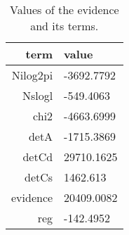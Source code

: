 \begin{table*}\caption{Values of the evidence and its terms.}\begin{center}\begin{tabular}{ r l } term & value \\
\hline Nilog2pi & -3692.7792 \\ 
Nslogl & -549.4063 \\ 
chi2 & -4663.6999 \\ 
detA & -1715.3869 \\ 
detCd & 29710.1625 \\ 
detCs & 1462.613 \\ 
evidence & 20409.0082 \\ 
reg & -142.4952 \\ 
\hline\end{tabular}\end{center}\label{tab:2}\end{table*}